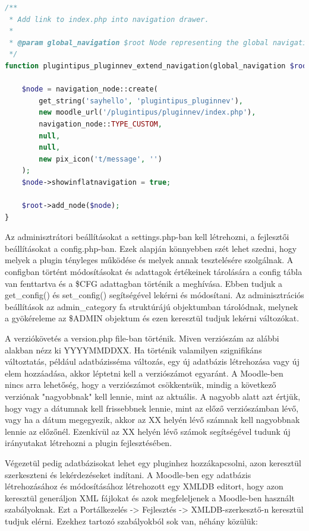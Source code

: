 \begin{lstlisting}[language=PHP]
/**
 * Add link to index.php into navigation drawer.
 *      
 * @param global_navigation $root Node representing the global navigation tree.
 */
function plugintipus_pluginnev_extend_navigation(global_navigation $root) {

    $node = navigation_node::create(
        get_string('sayhello', 'plugintipus_pluginnev'), 
        new moodle_url('/plugintipus/pluginnev/index.php'),
        navigation_node::TYPE_CUSTOM,
        null,
        null,
        new pix_icon('t/message', '')
    );
    $node->showinflatnavigation = true;

    $root->add_node($node);
}
\end{lstlisting}

Az adminisztrátori beállításokat a settings.php-ban kell létrehozni, a fejlesztői beállításokat a config.php-ban. Ezek alapján könnyebben szét lehet szedni, hogy melyek a plugin tényleges működése és melyek annak tesztelésére szolgálnak. A configban történt módosításokat és adattagok értékeinek tárolására a config tábla van fenttartva és a \$CFG adattagban történik a meghívása. Ebben tudjuk a get\_config() és set\_config() segítségével lekérni és módosítani. Az adminisztrációs beállítások az admin\_category fa struktúrájú objektumban tárolódnak, melynek a gyökéreleme az \$ADMIN objektum és ezen keresztül tudjuk lekérni változókat. \par

A verziókövetés a version.php file-ban történik. Miven verziószám az alábbi alakban nézz ki YYYYMMDDXX. Ha történik valamilyen szignifikáns változtatás, például adatbázisséma változás, egy új adatbázis létrehozása vagy új elem hozzáadása, akkor léptetni kell a verziószámot egyaránt. A Moodle-ben nincs arra lehetőség, hogy a verziószámot csökkentsük, mindig a következő verziónak "nagyobbnak" kell lennie, mint az aktuális. A nagyobb alatt azt értjük, hogy vagy a dátumnak kell frissebbnek lennie, mint az előző verziószámban lévő, vagy ha a dátum megegyezik, akkor az XX helyén lévő számnak kell nagyobbnak lennie az előzőnél. Ezenkívül az XX helyén lévő számok segítségével tudunk új irányutakat létrehozni a plugin fejlesztésében. \par

Végezetül pedig adatbázisokat lehet egy pluginhez hozzákapcsolni, azon keresztül szerkeszteni és lekérdezéseket indítani. A Moodle-ben egy adatbázis létrehozásához és módosításához létrehozott egy XMLDB editort, hogy azon keresztül generáljon XML fájlokat és azok megfeleljenek a Moodle-ben használt szabályoknak. Ezt a Portálkezelés -> Fejlesztés -> XMLDB-szerkesztő-n keresztül tudjuk elérni. Ezekhez tartozó szabályokból sok van, néhány közülük:

